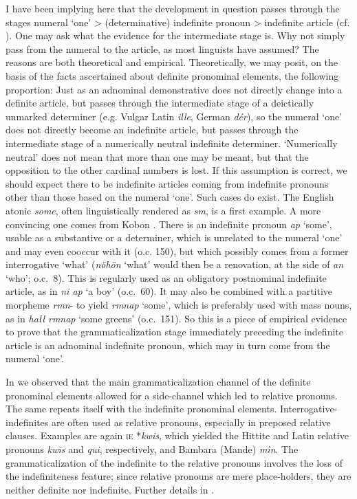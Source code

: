 I have been implying here that the development in question passes through the stages numeral ‘one’ {\textgreater} (determinative) indefinite pronoun {\textgreater} indefinite article (cf. \citealt[273]{HeineEtAl1984}). One may ask what the evidence for the intermediate stage is. Why not simply pass from the numeral to the article, as most linguists have assumed? The reasons are both theoretical and empirical. Theoretically, we may posit, on the basis of the facts ascertained about definite pronominal elements, the following proportion: Just as an adnominal demonstrative does not directly change into a definite article, but passes through the intermediate stage of a deictically unmarked determiner (e.g. Vulgar Latin \textit{ille}, German \textit{dér}), so the numeral ‘one’ does not directly become an indefinite article, but passes through the intermediate stage of a numerically neutral indefinite determiner. ‘Numerically neutral’ does not mean that more than one may be meant, but that the opposition to the other cardinal numbers is lost. If this assumption is correct, we should expect there to be indefinite articles coming from indefinite pronouns other than those based on the numeral ‘one’. Such cases do exist. The English atonic \textit{some}, often linguistically rendered as \textit{sm}, is a first example. A more convincing one comes from Kobon \citep{Davies1981}. There is an indefinite pronoun \textit{ap} ‘some’, usable as a substantive or a determiner, which is unrelated to the numeral ‘one’ and may even cooccur with it (o.c. 150), but which possibly comes from a former interrogative ‘what’ (\textit{nöhön} ‘what’ would then be a renovation, at the side of \textit{an} ‘who’; o.c.~8). This is regularly used as an obligatory postnominal indefinite article, as in \textit{ni ap} ‘a boy’ (o.c.~60). It may also be combined with a partitive morpheme \textit{rmn}{}- to yield \textit{rmnap} ‘some’, which is preferably used with mass nouns, as in \textit{hałl rmnap} ‘some greens’ (o.c.~151). So this is a piece of empirical evidence to prove that the grammaticalization stage immediately preceding the indefinite article is an adnominal indefinite pronoun, which may in turn come from the numeral ‘one’.

In  we observed that the main grammaticalization channel of the definite pronominal elements allowed for a side-channel which led to relative pronouns. The same repeats itself with the indefinite pronominal elements. Interrogative-indefinites are often used as relative pronouns, especially in preposed relative clauses. Examples are again \textsc{ie} *\textit{kwis}, which yielded the Hittite and Latin relative pronouns \textit{kwis} and \textit{qui}, respectively, and Bambara (Mande) \textit{mìn}. The grammaticalization of the indefinite to the relative pronouns involves the loss of the indefiniteness feature; since relative pronouns are mere place-holders, they are neither definite nor indefinite. Further details in \citealt[Ch.~V.2.3, §~2]{Lehmann1984}.

